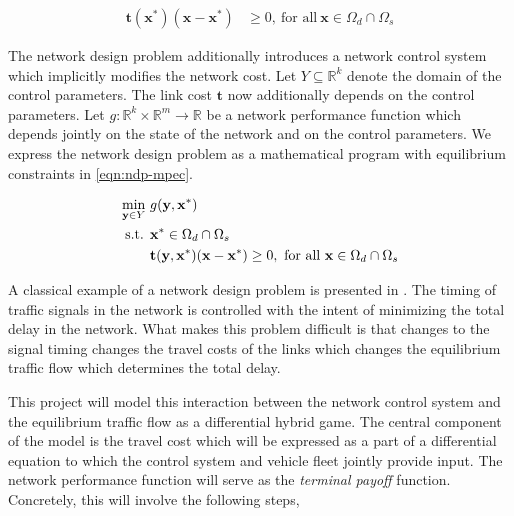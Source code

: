 \begin{align}
    \mathbf{t}(\mathbf{x^*})(\mathbf{x}- \mathbf{x^*}) &\geq 0,\ \text{for all}\ \mathbf{x} \in \Omega_d\cap \Omega_s \label{eqn:ui-vi}
\end{align}

The network design problem additionally introduces a network control system which implicitly modifies the network cost.
Let $Y\subseteq \mathbb{R}^k$ denote the domain of the control parameters. The link cost $\mathbf{t}$ now additionally depends on the control parameters.
Let $g:\mathbb{R}^k\times \mathbb{R}^m\to \mathbb{R}$ be a network performance function which depends jointly on the state of the network and on the control parameters.
We express the network design problem as a mathematical program with equilibrium constraints in \eqref{eqn:ndp-mpec}.

\begin{subequations}
\begin{align}
    \min_{\mathbf{y}\in Y}\ & g(\mathbf{y}, \mathbf{x^*})\\
    \text{ s.t. } 
        & \mathbf{x^*} \in \Omega_d \cap \Omega_s\\
        &  \mathbf{t}(\mathbf{y}, \mathbf{x^*})(\mathbf{x}- \mathbf{x^*}) \geq 0,\ \text{for all}\ \mathbf{x} \in \Omega_d\cap \Omega_s
\end{align}\label{eqn:ndp-mpec}
\end{subequations}

A classical example of a network design problem is presented in \citet{sheffi1983optimal}.
The timing of traffic signals in the network is controlled with the intent of minimizing the total delay in the network.
What makes this problem difficult is that changes to the signal timing changes the travel costs of the links which changes the equilibrium traffic flow which determines the total delay.

This project will model this interaction between the network control system and the equilibrium traffic flow as a differential hybrid game.
The central component of the model is the travel cost which will be expressed as a part of a differential equation to which the control system and vehicle fleet jointly provide input.
The network performance function will serve as the \textit{terminal payoff} function.
Concretely, this will involve the following steps,

